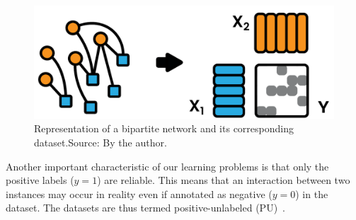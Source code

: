 \begin{figure}[tb]
    \centering
    \includegraphics[width=.5\textwidth]{figures/bipartite_dataset.pdf}
    \caption{Representation of a bipartite network and its corresponding dataset.\newline Source: By the author.}
    \label{fig:bipartite dataset}
\end{figure}

Another important characteristic of our learning problems is that only the positive labels ($y=1$) are reliable. This means that an interaction between two instances may occur in reality even if annotated as negative ($y=0$) in the dataset. The datasets are thus termed positive-unlabeled (PU)~\cite{bekker2020learning}.







%

